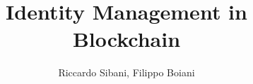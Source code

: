 \documentclass[preprint,12pt]{elsarticle}
\begin{document}
\begin{frontmatter}



\title{Identity Management in Blockchain}



\author{Riccardo Sibani, Filippo Boiani}

\address{KTH, Kungliga Tekniska Högskolans} 










\end{frontmatter}
\end{document}

